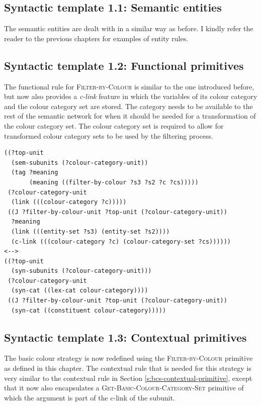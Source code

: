 \subsection{Syntactic template 1.1: Semantic entities}

The semantic entities are dealt with in a similar way as before. I
kindly refer the reader to the previous chapters for examples of
entity rules.

\subsection{Syntactic template 1.2: Functional primitives}

The functional rule for \textsc{Filter-by-Colour} is similar to the
one introduced before, but now also provides a \emph{c-link} feature
in which the variables of its colour category and the colour category
set are stored. The category needs to be available to the rest of the
semantic network for when it should be needed for a transformation of
the colour category set. The colour category set is required to allow
for transformed colour category sets to be used by the filtering
process.

\footnotesize
{}
\begin{lstlisting}
((?top-unit
  (sem-subunits (?colour-category-unit)) 
  (tag ?meaning
       (meaning ((filter-by-colour ?s3 ?s2 ?c ?cs)))))
 (?colour-category-unit 
  (link (((colour-category ?c)))))
 ((J ?filter-by-colour-unit ?top-unit (?colour-category-unit))
  ?meaning
  (link (((entity-set ?s3) (entity-set ?s2))))
  (c-link (((colour-category ?c) (colour-category-set ?cs))))))
<-->
((?top-unit 
  (syn-subunits (?colour-category-unit)))
 (?colour-category-unit 
  (syn-cat ((lex-cat colour-category))))
 ((J ?filter-by-colour-unit ?top-unit (?colour-category-unit))
  (syn-cat ((constituent colour-category)))))
\end{lstlisting}
\normalsize

\subsection{Syntactic template 1.3: Contextual primitives}

The basic colour strategy is now redefined 
using the \textsc{Filter-by-Colour} primitive as defined in this
chapter. The contextual rule that is needed for this strategy
is very similar to the contextual rule in Section
\ref{s:bcs-contextual-primitive}, except that it now also encapsulates
a \textsc{Get-Basic-Colour-Category-Set} primitive of which the argument is part of
the c-link of the subunit.

